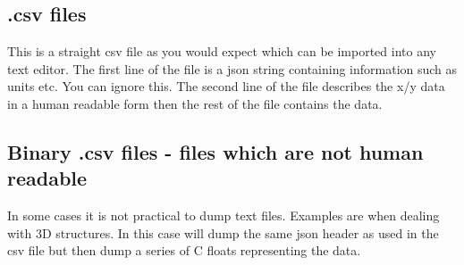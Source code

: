 \subsection{.csv files}
This is a straight csv file as you would expect which can be imported into any text editor.  The first line of the file is a json string containing information such as units etc.  You can ignore this. The second line of the file describes the x/y data in a human readable form then the rest of the file contains the data.

\subsection{Binary .csv files - files which are not human readable}
In some cases it is not practical to dump text files. Examples are when dealing with 3D structures.  In this case \simname will dump the same json header as used in the csv file but then dump a series of C floats representing the data.

